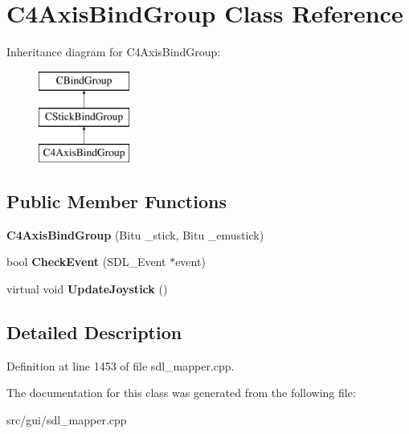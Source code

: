 \hypertarget{classC4AxisBindGroup}{\section{C4\-Axis\-Bind\-Group Class Reference}
\label{classC4AxisBindGroup}
}
Inheritance diagram for C4\-Axis\-Bind\-Group\-:\begin{figure}[H]
\begin{center}
\leavevmode
\includegraphics[height=3.000000cm]{classC4AxisBindGroup}
\end{center}
\end{figure}
\subsection*{Public Member Functions}
\begin{DoxyCompactItemize}
\item 
\hypertarget{classC4AxisBindGroup_a18f535cb78f267a882176039fa912394}{{\bfseries C4\-Axis\-Bind\-Group} (Bitu \-\_\-stick, Bitu \-\_\-emustick)}\label{classC4AxisBindGroup_a18f535cb78f267a882176039fa912394}

\item 
\hypertarget{classC4AxisBindGroup_a895bb30dd9adc0b2a704e30d954b7f5e}{bool {\bfseries Check\-Event} (S\-D\-L\-\_\-\-Event $\ast$event)}\label{classC4AxisBindGroup_a895bb30dd9adc0b2a704e30d954b7f5e}

\item 
\hypertarget{classC4AxisBindGroup_a2de71ed1c0b11f15403f1a63ea7f9169}{virtual void {\bfseries Update\-Joystick} ()}\label{classC4AxisBindGroup_a2de71ed1c0b11f15403f1a63ea7f9169}

\end{DoxyCompactItemize}


\subsection{Detailed Description}


Definition at line 1453 of file sdl\-\_\-mapper.\-cpp.



The documentation for this class was generated from the following file\-:\begin{DoxyCompactItemize}
\item 
src/gui/sdl\-\_\-mapper.\-cpp\end{DoxyCompactItemize}

